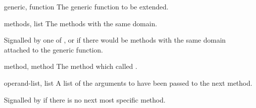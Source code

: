 \begin{optDefinition}
%
\begin{initoptions}
    \item[generic, function] The generic function to be extended.
    \item[methods, list] The methods with the same domain.
\end{initoptions}
%
\remarks%
Signalled by one of ,  or
 if there would be methods with the same domain
attached to the generic function.

%
\begin{initoptions}

    \item[method, method] The method which called .

    \item[operand-list, list] A list of the arguments to have been passed to the
    next method.
\end{initoptions}
%
\remarks%
Signalled by  if there is no next most specific
method.
%
\end{optDefinition}

